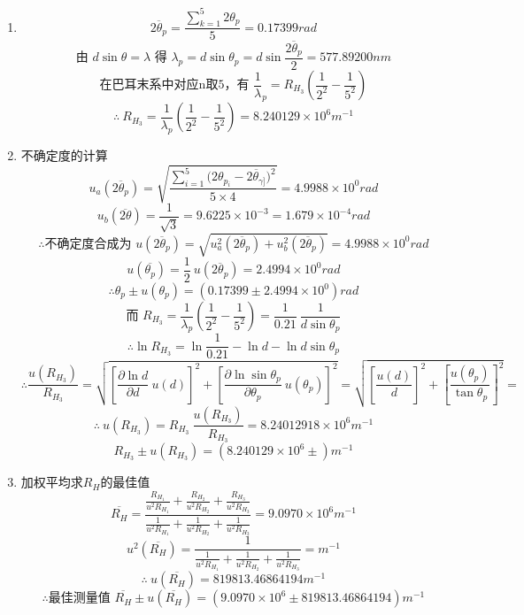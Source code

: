 \documentclass[11pt,a4paper,oneside]{article}
\begin{document}
\begin{enumerate}
  \item { }
      $$\overline{2{\theta}_p} = \displaystyle\frac{\sum_{k=1}^5 2{\theta}_p}{5} = 0.17399rad$$
      $$\displaystyle\text{由\ }d\sin{\theta} = {\lambda}\text{\ 得\ }{\lambda}_p = d\sin{\theta}_p = d\sin{\frac{\overline{2{\theta}_p}}{2}} = 577.89200nm$$
      $$\displaystyle\text{在巴耳末系中对应n取5，有\ }\frac{1}{\lambda}_p = R_{H_3}\left(\frac{1}{2^2}-\frac{1}{5^2}\right)$$
      $$\therefore\ \displaystyle R_{H_3} = \frac{1}{ {\lambda}_p}\left(\frac{1}{2^2}-\frac{1}{5^2}\right) = 8.240129{\times}10^{6}m^{-1}$$
  \item {不确定度的计算}
      $$u_a(\overline{2{\theta}_p}) = \displaystyle\sqrt{\frac{\sum_{i=1}^5{(2{\theta}_{p_{i}}-\overline{2{\theta}_{\gamma]}}})^2}{5\times4}}=4.9988{\times}10^{0} rad$$
      $$u_b(\overline{2\theta}) = \displaystyle\frac{1}{\sqrt3} = 9.6225\times10^{-3} = 1.679 \times 10^{-4} rad$$
      $$\therefore\text{不确定度合成为\ }u(\overline{2{\theta}_p}) = \sqrt{u_a^2(\overline{2{\theta}_p})+u_b^2(\overline{2{\theta}_p})} = 4.9988{\times}10^{0}rad$$
      $$u(\overline{ {\theta}_p})= \displaystyle\frac12\ u(\overline{2{\theta}_p}) = 2.4994{\times}10^{0}rad$$
      $$\therefore{\theta}_p \pm u({\theta}_p) = (0.17399 \pm 2.4994{\times}10^{0})rad$$
      $$\text{而\ }\displaystyle R_{H_3} = \frac{1}{ {\lambda}_p}\left(\frac{1}{2^2}-\frac{1}{5^2}\right) = \frac{1}{0.21}\ \frac{1}{d\sin{\theta}_p}$$
      $$\therefore\ln{R_{H_3}} = \ln{\frac{1}{0.21}} -\ln{d} - \ln{d\sin{\theta}_p}$$
      $$\therefore\displaystyle \frac{u(R_{H_3})}{R_{H_3}} = \sqrt{ {\left[\frac{\partial{\ln{d}}}{\partial{d}}\ u(d)\right]}^2 + {\left[\frac{\partial{\ln{\sin{ {\theta}_p}}}}{\partial{ {\theta}_p}}\ u({\theta}_p)\right]}^2} = \sqrt{ {\left[\frac{u(d)}{d}\right]}^2 + {\left[\frac{u({\theta}_p)}{\tan{ {\theta}_p}}\right]}^2} = $$
      $$\therefore \ u(R_{H_3}) = \displaystyle R_{H_3}\ \frac{u(R_{H_3})}{R_{H_3}} = 8.24012918{\times}10^{6}m^{-1}$$ 
      $$R_{H_3} \pm u(R_{H_3}) = (8.240129{\times}10^{6} \pm )m^{-1}$$
  \item{加权平均求$R_H$的最佳值}
      $$\overline{R_H} = \displaystyle\frac{\frac{R_{H_1}}{u^2{R_{H_1}}}+\frac{R_{H_2}}{u^2{R_{H_2}}}+\frac{R_{H_3}}{u^2{R_{H_3}}}}{\frac{1}{u^2{R_{H_1}}}+\frac{1}{u^2{R_{H_2}}}+\frac{1}{u^2{R_{H_3}}}} = 9.0970{\times}10^{6}m^{-1}$$
      $$u^2(\overline{R_H}) = \displaystyle\frac{1}{\frac{1}{u^2{R_{H_1}}}+\frac{1}{u^2{R_{H_2}}}+\frac{1}{u^2{R_{H_3}}}} = m^{-1}$$
      $$\therefore \ u(\overline{R_H}) = 819813.46864194m^{-1} $$
      $$\therefore\text{最佳测量值 \ } \overline{R_H} \pm u(\overline{R_H}) = (9.0970{\times}10^{6} \pm 819813.46864194) m^{-1}$$   
\end{enumerate}
\end{document}
